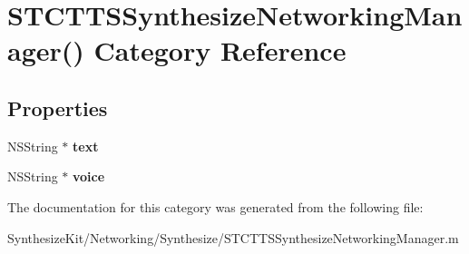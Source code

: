 \hypertarget{category_s_t_c_t_t_s_synthesize_networking_manager_07_08}{}\section{S\+T\+C\+T\+T\+S\+Synthesize\+Networking\+Manager() Category Reference}
\label{category_s_t_c_t_t_s_synthesize_networking_manager_07_08}
\subsection*{Properties}
\begin{DoxyCompactItemize}
\item 
\hypertarget{category_s_t_c_t_t_s_synthesize_networking_manager_07_08_acfe40088f00effeee98e003c6520230f}{}\label{category_s_t_c_t_t_s_synthesize_networking_manager_07_08_acfe40088f00effeee98e003c6520230f} 
N\+S\+String $\ast$ {\bfseries text}
\item 
\hypertarget{category_s_t_c_t_t_s_synthesize_networking_manager_07_08_a4b1df632d7ee3ebc9c893667a521ed5f}{}\label{category_s_t_c_t_t_s_synthesize_networking_manager_07_08_a4b1df632d7ee3ebc9c893667a521ed5f} 
N\+S\+String $\ast$ {\bfseries voice}
\end{DoxyCompactItemize}


The documentation for this category was generated from the following file\+:\begin{DoxyCompactItemize}
\item 
Synthesize\+Kit/\+Networking/\+Synthesize/S\+T\+C\+T\+T\+S\+Synthesize\+Networking\+Manager.\+m\end{DoxyCompactItemize}
